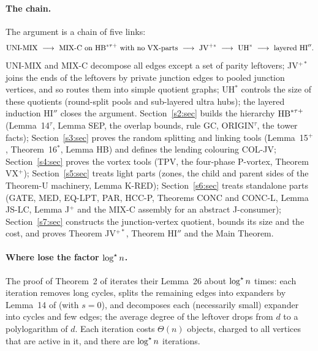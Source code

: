 \paragraph{The chain.} The argument is a chain of five links:
\[
\text{UNI-MIX}\ \longrightarrow\ \text{MIX-C on }\mathrm{HB}^{*\tau{+}}\text{ with no VX-parts}
\ \longrightarrow\ \text{JV}^{+*}\ \longrightarrow\ \text{UH}^{*}
\ \longrightarrow\ \text{layered HI}''.
\]
UNI-MIX and MIX-C decompose all edges except a set of parity leftovers; JV$^{+*}$
joins the ends of the leftovers by private junction edges to pooled junction
vertices, and so routes them into simple quotient graphs; UH$^{*}$ controls the size of these quotients (round-split pools and
sub-layered ultra hubs); the layered induction HI$''$ closes the argument.
Section~\ref{s2:sec} builds the hierarchy $\mathrm{HB}^{*\tau{+}}$ (Lemma~14$^\tau$, Lemma SEP,
the overlap bounds, rule GC, ORIGIN$^\tau$, the tower facts);
Section~\ref{s3:sec} proves the random splitting and linking tools
(Lemma~15$^+$, Theorem~16$^*$, Lemma HB) and defines the lending colouring
COL-JV; Section~\ref{s4:sec} proves the vortex tools (TPV, the four-phase
P-vortex, Theorem VX$^+$); Section~\ref{s5:sec} treats light parts (zones, the
child and parent sides of the Theorem-U machinery, Lemma K-RED);
Section~\ref{s6:sec} treats standalone parts (GATE, MED, EQ-LPT, PAR, HCC-P,
Theorems CONC and CONC-L, Lemma JS-LC, Lemma J$^+$ and the MIX-C assembly for an
abstract J-consumer); Section~\ref{s7:sec} constructs the junction-vertex
quotient, bounds its size and the cost, and proves Theorem JV$^{+*}$,
Theorem HI$''$ and the Main Theorem.

\paragraph{Where \BMnames{} lose the factor $\log^{\star} n$.} The proof of Theorem~2
of \cite{BM} iterates their Lemma~26 about $\log^{\star} n$ times: each iteration
removes long cycles, splits the remaining edges into expanders by Lemma~14 of
\cite{BM} (with $s=0$), and decomposes each (necessarily small) expander into
cycles and few edges; the average degree of the leftover drops from $d$ to a
polylogarithm of $d$. Each iteration costs $\Theta(n)$ objects, charged to all
vertices that are active in it, and there are $\log^{\star} n$ iterations.

